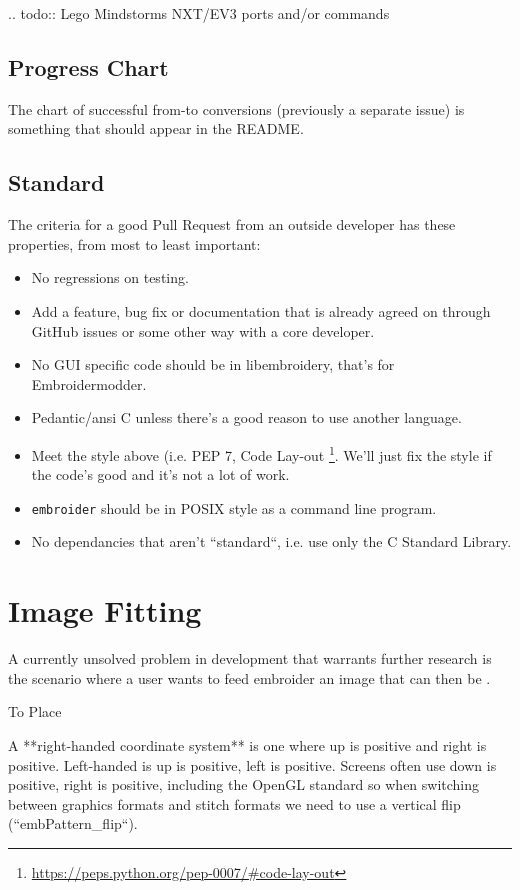 \documentclass[a4paper]{report}
\begin{document}
.. todo::
   Lego Mindstorms NXT/EV3 ports and/or commands

\subsection{Progress Chart}

The chart of successful from-to conversions (previously a separate issue)
is something that should appear in the README.

\subsection{Standard}

The criteria for a good Pull Request from an outside developer has these properties, from most to least important:

\begin{itemize}
\item No regressions on testing.
\item Add a feature, bug fix or documentation that is already agreed on through
    GitHub issues or some other way with a core developer.
\item No GUI specific code should be in libembroidery, that's for Embroidermodder.
\item Pedantic/ansi C unless there's a good reason to use another language.
\item Meet the style above (i.e.  PEP 7, Code Lay-out
    \footnote{\url{https://peps.python.org/pep-0007/#code-lay-out}}.
    We'll just fix the style if the code's good and it's not a lot of work.
\item \texttt{embroider} should be in POSIX style as a command line program.
\item No dependancies that aren't ``standard``, i.e. use only the C Standard Library.
\end{itemize}
\fi

\section{Image Fitting}

A currently unsolved problem in development that warrants further research is
the scenario where a user wants to feed embroider an image that can then be .

To Place
~~~~~~~~

A **right-handed coordinate system** 
is one where up is positive and right is
positive. Left-handed is up is positive, left is positive. Screens often use
down is positive, right is positive, including the OpenGL standard so when
switching between graphics formats and stitch formats we need to use a vertical
flip (``embPattern\_flip``).
\end{document}
